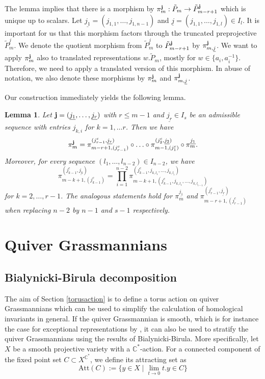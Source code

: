\documentclass{amsart}
\newtheorem{lemma}[theorem]{Lemma}
\newcommand{\C}{\mathbb{C}}
\newcommand{\uj}{\underline j}
\begin{document}
The lemma implies that there is a morphism by $\pi_m^{\bf j}:\tilde P_m\to \tilde P_{m-r+1}^{\bf j}$ which is unique up to scalars. Let $\underline{j_1}=(j_{1,1},\ldots,j_{1,n-1})$ and $\uj=(j_{1,1},\ldots,j_{1,l})\in I_l$. It is important for us that this morphism factors through the truncated preprojective $\tilde P_m^{\uj}$. We denote the quotient morphism from $\tilde P_m^{\uj}$ to $\tilde P_{m-r+1}^{\bf j}$ by $\pi_{m,\uj}^{\bf j}$. We want to apply $\pi_m^{\bf j}$ also to translated representations $w.\tilde P_m$, mostly for $w\in\{a_i,a_i^{-1}\}$. Therefore, we need to apply a translated version of this morphism. In abuse of notation, we also denote these morphisms by $\pi_m^{\bf j}$ and $\pi_{m,\uj}^{\bf j}$.

Our construction immediately yields the following lemma.
\begin{lemma}\label{projections}
Let ${\bf j}=(\underline{j_1},\ldots,\underline{j_r})$ with $r\leq m-1$ and $\underline{j_r}\in I_s$ be an admissible sequence with entries $j_{k,i}$ for $k=1,\ldots r$. Then we have
\[\pi_m^{\bf j}=\pi_{m-r+1,(j_{r-1}^c)}^{(j_{r-1}^c,\underline{j_r})}\circ\ldots\circ\pi^{(j_{2}^c,\underline{j_2})}_{m-1,(j_1^c)}\circ\pi_m^{\underline{j_1}}.\]
Moreover, for every sequence $(l_1,\ldots,l_{n-2})\in I_{n-2}$, we have
\[\pi_{m-k+1,(j_{k-1}^c)}^{(j_{k-1}^c,\underline{j_k})}=\prod_{i=1}^{n-2} \pi^{(j_{k-1}^c,j_{k,l_1},\ldots, j_{k,l_{i}})}_{m-k+1,(j_{k-1}^c,j_{k,l_1},\ldots,j_{k,l_{i-1}})}\]
for $k=2,\ldots,r-1$. The analogous statements hold for $\pi_m^{\underline{j_1}}$ and  $\pi_{m-r+1,(j_{r-1}^c)}^{(j_{r-1}^c,\underline{j_r})}$ when replacing $n-2$ by $n-1$ and $s-1$ respectively.
\end{lemma}

\section{Quiver Grassmannians}
\label{QG}

\subsection{Bialynicki-Birula decomposition}
The aim of Section \ref{torusaction} is to define a torus action on quiver Grassmannians which can be used to simplify the calculation of homological invariants in general.
If the quiver Grassmannian is smooth, which is for instance the case for exceptional representations by \cite{cr}, it can also be used to stratify the quiver Grassmannians using the results of Bialynicki-Birula.
More specifically, let $X$ be a smooth projective variety with a $\C^\ast$-action.
For a connected component of the fixed point set $C\subset X^{\C^\ast}$, we define its attracting set as
\[
  \mathrm{Att}(C):=\{y\in X\mid \lim_{t\to 0}t.y\in C\}
\]
\end{document}
